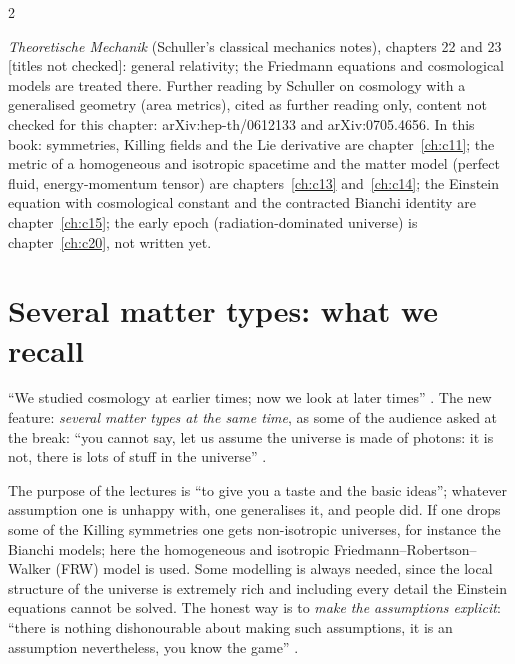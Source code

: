 \begin{paracol}{2}
\begin{reading}
\emph{Theoretische Mechanik} (Schuller's classical mechanics notes), chapters 22 and 23 [titles not checked]: general relativity; the Friedmann equations and cosmological models are treated there. Further reading by Schuller on cosmology with a generalised geometry (area metrics), cited as further reading only, content not checked for this chapter: arXiv:hep-th/0612133 and arXiv:0705.4656. In this book: symmetries, Killing fields and the Lie derivative are chapter~\ref{ch:c11}; the metric of a homogeneous and isotropic spacetime and the matter model (perfect fluid, energy-momentum tensor) are chapters~\ref{ch:c13} and~\ref{ch:c14}; the Einstein equation with cosmological constant and the contracted Bianchi identity are chapter~\ref{ch:c15}; the early epoch (radiation-dominated universe) is chapter~\ref{ch:c20}, not written yet.
\end{reading}

\section{Several matter types: what we recall}\label{sec:c21-recall}

``We studied cosmology at earlier times; now we look at later times'' . The new feature: \emph{several matter types at the same time}, as some of the audience asked at the break: ``you cannot say, let us assume the universe is made of photons: it is not, there is lots of stuff in the universe'' .

\begin{coursenote}
The purpose of the lectures is ``to give you a taste and the basic ideas''; whatever assumption one is unhappy with, one generalises it, and people did. If one drops some of the Killing symmetries one gets non-isotropic universes, for instance the Bianchi models; here the homogeneous and isotropic Friedmann--Robertson--Walker (FRW) model is used. Some modelling is always needed, since the local structure of the universe is extremely rich and including every detail the Einstein equations cannot be solved. The honest way is to \emph{make the assumptions explicit}: ``there is nothing dishonourable about making such assumptions, it is an assumption nevertheless, you know the game'' .
\end{coursenote}


\end{paracol}
